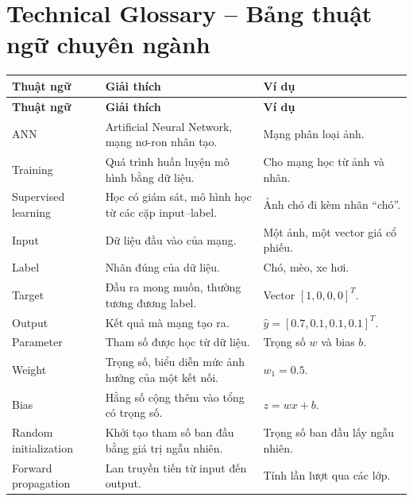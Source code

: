 \section{Technical Glossary -- Bảng thuật ngữ chuyên ngành}

\small
\begin{longtable}{p{}p{}p{}}
\toprule
\textbf{Thuật ngữ} & \textbf{Giải thích} & \textbf{Ví dụ} \\
\midrule
\endfirsthead

\toprule
\textbf{Thuật ngữ} & \textbf{Giải thích} & \textbf{Ví dụ} \\
\midrule
\endhead

ANN & Artificial Neural Network, mạng nơ-ron nhân tạo. & Mạng phân loại ảnh. \\

Training & Quá trình huấn luyện mô hình bằng dữ liệu. & Cho mạng học từ ảnh và nhãn. \\

Supervised learning & Học có giám sát, mô hình học từ các cặp input--label. & Ảnh chó đi kèm nhãn ``chó''. \\

Input & Dữ liệu đầu vào của mạng. & Một ảnh, một vector giá cổ phiếu. \\

Label & Nhãn đúng của dữ liệu. & Chó, mèo, xe hơi. \\

Target & Đầu ra mong muốn, thường tương đương label. & Vector $[1,0,0,0]^T$. \\

Output & Kết quả mà mạng tạo ra. & $\hat{y}=[0.7,0.1,0.1,0.1]^T$. \\

Parameter & Tham số được học từ dữ liệu. & Trọng số $w$ và bias $b$. \\

Weight & Trọng số, biểu diễn mức ảnh hưởng của một kết nối. & $w_1=0.5$. \\

Bias & Hằng số cộng thêm vào tổng có trọng số. & $z=wx+b$. \\

Random initialization & Khởi tạo tham số ban đầu bằng giá trị ngẫu nhiên. & Trọng số ban đầu lấy ngẫu nhiên. \\

Forward propagation & Lan truyền tiến từ input đến output. & Tính lần lượt qua các lớp. \\


\end{longtable}
